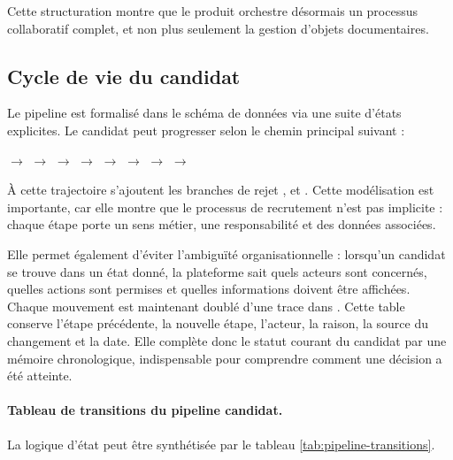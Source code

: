 Cette structuration montre que le produit orchestre désormais un processus collaboratif complet, et non plus seulement la gestion d'objets documentaires.

\subsection{Cycle de vie du candidat}
Le pipeline est formalisé dans le schéma de données via une suite d'états explicites. Le candidat peut progresser selon le chemin principal suivant :
\begin{center}
 $\rightarrow$  $\rightarrow$  $\rightarrow$  $\rightarrow$  $\rightarrow$  $\rightarrow$  $\rightarrow$  $\rightarrow$ 
\end{center}

À cette trajectoire s'ajoutent les branches de rejet ,  et . Cette modélisation est importante, car elle montre que le processus de recrutement n'est pas implicite : chaque étape porte un sens métier, une responsabilité et des données associées.

Elle permet également d'éviter l'ambiguïté organisationnelle : lorsqu'un candidat se trouve dans un état donné, la plateforme sait quels acteurs sont concernés, quelles actions sont permises et quelles informations doivent être affichées.
Chaque mouvement est maintenant doublé d'une trace dans . Cette table conserve l'étape précédente, la nouvelle étape, l'acteur, la raison, la source du changement et la date. Elle complète donc le statut courant du candidat par une mémoire chronologique, indispensable pour comprendre comment une décision a été atteinte.
\paragraph{Tableau de transitions du pipeline candidat.}
La logique d'état peut être synthétisée par le tableau \ref{tab:pipeline-transitions}.

